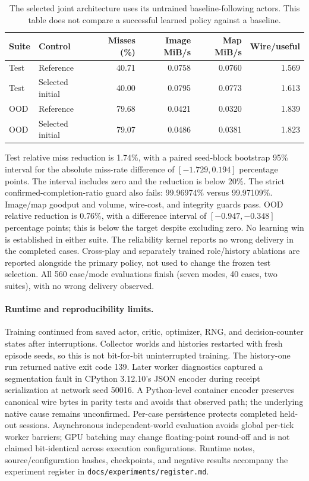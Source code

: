 \documentclass[11pt]{article}
\begin{document}
\begin{table}[ht]
\centering\small
\begin{tabular}{llrrrr}
\toprule
Suite & Control & Misses (\%) & Image MiB/s & Map MiB/s & Wire/useful \\
\midrule
Test & Reference & 40.71 & 0.0758 & 0.0760 & 1.569 \\
Test & Selected initial & 40.00 & 0.0795 & 0.0773 & 1.613 \\
OOD & Reference & 79.68 & 0.0421 & 0.0320 & 1.839 \\
OOD & Selected initial & 79.07 & 0.0486 & 0.0381 & 1.823 \\
\bottomrule
\end{tabular}
\caption{The selected joint architecture uses its untrained baseline-following
actors. This table does not compare a successful learned policy against a baseline.}
\label{tab:joint-primary}
\end{table}

Test relative miss reduction is 1.74\%, with a paired seed-block bootstrap
95\% interval for the absolute miss-rate difference of
$[-1.729,0.194]$ percentage points. The interval includes zero and the reduction
is below 20\%. The strict confirmed-completion-ratio guard also fails:
99.96974\% versus 99.97109\%. Image/map goodput and volume, wire-cost, and
integrity guards pass. OOD relative reduction is 0.76\%, with a difference
interval of $[-0.947,-0.348]$ percentage points; this is below the target despite
excluding zero. No learning win is established in either suite. The reliability
kernel reports no wrong delivery in the completed cases. Cross-play and
separately trained role/history ablations are reported alongside the primary
policy, not used to change the frozen test selection. All 560 case/mode evaluations
finish (seven modes, 40 cases, two suites), with no wrong delivery observed.

\paragraph{Runtime and reproducibility limits.}
Training continued from saved actor, critic, optimizer, RNG, and decision-counter
states after interruptions. Collector worlds and histories restarted with fresh
episode seeds, so this is not bit-for-bit uninterrupted training. The history-one
run returned native exit code 139. Later worker diagnostics captured a segmentation
fault in CPython 3.12.10's JSON encoder during receipt serialization at network
seed 50016. A Python-level container encoder preserves canonical wire bytes in
parity tests and avoids that observed path; the underlying native cause remains
unconfirmed. Per-case persistence protects completed held-out sessions.
Asynchronous independent-world evaluation avoids global per-tick worker barriers;
GPU batching may change floating-point round-off and is not claimed bit-identical
across execution configurations. Runtime notes, source/configuration hashes,
checkpoints, and negative results accompany the experiment register in
\texttt{docs/experiments/register.md}.
\end{document}
